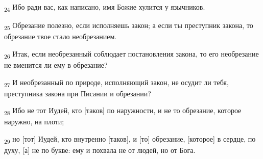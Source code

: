 \begin{tcolorbox}
\textsubscript{24} Ибо ради вас, как написано, имя Божие хулится у язычников.
\end{tcolorbox}
\begin{tcolorbox}
\textsubscript{25} Обрезание полезно, если исполняешь закон; а если ты преступник закона, то обрезание твое стало необрезанием.
\end{tcolorbox}
\begin{tcolorbox}
\textsubscript{26} Итак, если необрезанный соблюдает постановления закона, то его необрезание не вменится ли ему в обрезание?
\end{tcolorbox}
\begin{tcolorbox}
\textsubscript{27} И необрезанный по природе, исполняющий закон, не осудит ли тебя, преступника закона при Писании и обрезании?
\end{tcolorbox}
\begin{tcolorbox}
\textsubscript{28} Ибо не тот Иудей, кто [таков] по наружности, и не то обрезание, которое наружно, на плоти;
\end{tcolorbox}
\begin{tcolorbox}
\textsubscript{29} но [тот] Иудей, кто внутренно [таков], и [то] обрезание, [которое] в сердце, по духу, [а] не по букве: ему и похвала не от людей, но от Бога.
\end{tcolorbox}
